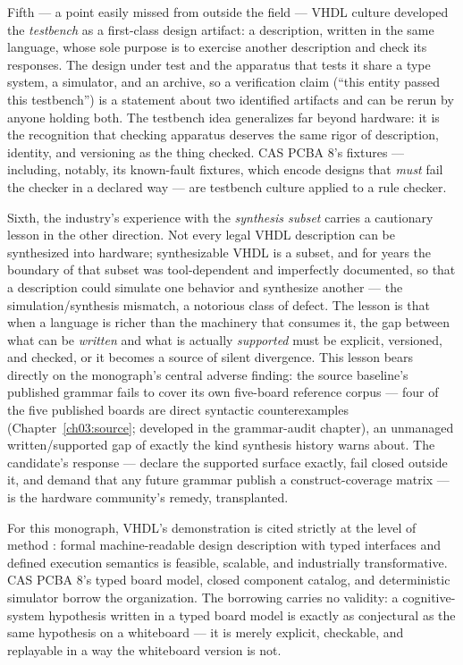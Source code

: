 Fifth --- a point easily missed from outside the field --- VHDL culture
developed the \emph{testbench} as a first-class design artifact: a
description, written in the same language, whose sole purpose is to
exercise another description and check its responses. The design under
test and the apparatus that tests it share a type system, a simulator, and
an archive, so a verification claim (``this entity passed this testbench'')
is a statement about two identified artifacts and can be rerun by anyone
holding both. The testbench idea generalizes far beyond hardware: it is
the recognition that checking apparatus deserves the same rigor of
description, identity, and versioning as the thing checked. CAS PCBA 8's
fixtures --- including, notably, its known-fault fixtures, which encode
designs that \emph{must} fail the checker in a declared way --- are
testbench culture applied to a rule checker.

Sixth, the industry's experience with the \emph{synthesis subset} carries
a cautionary lesson in the other direction. Not every legal VHDL
description can be synthesized into hardware; synthesizable VHDL is a
subset, and for years the boundary of that subset was tool-dependent and
imperfectly documented, so that a description could simulate one behavior
and synthesize another --- the simulation/synthesis mismatch, a notorious
class of defect. The lesson is that when a language is richer than the
machinery that consumes it, the gap between what can be \emph{written}
and what is actually \emph{supported} must be explicit, versioned, and
checked, or it becomes a source of silent divergence. This lesson bears
directly on the monograph's central adverse finding: the source
baseline's published grammar fails to cover its own five-board reference
corpus --- four of the five published boards are direct syntactic
counterexamples (Chapter~\ref{ch03:source}; developed in the grammar-audit
chapter), an unmanaged written/supported gap of exactly
the kind synthesis history warns about. The candidate's response ---
declare the supported surface exactly, fail closed outside it, and demand
that any future grammar publish a construct-coverage matrix --- is the
hardware community's remedy, transplanted.

For this monograph, VHDL's demonstration is cited strictly at the level of
method \cite{vhdl}: formal machine-readable design description with typed
interfaces and defined execution semantics is feasible, scalable, and
industrially transformative. CAS PCBA 8's typed board model, closed
component catalog, and deterministic simulator borrow the organization.
The borrowing carries no validity: a cognitive-system hypothesis written in
a typed board model is exactly as conjectural as the same hypothesis on a
whiteboard --- it is merely explicit, checkable, and replayable in a way
the whiteboard version is not.

